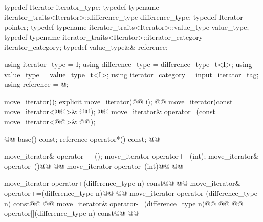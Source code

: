 %
\begin{codeblock}
namespace std { @@
  template <@@>
  class move_iterator {
  public:
\end{codeblock}\begin{removedblock}\begin{codeblock}
    typedef Iterator                                              iterator_type;
    typedef typename iterator_traits<Iterator>::difference_type   difference_type;
    typedef Iterator                                              pointer;
    typedef typename iterator_traits<Iterator>::value_type        value_type;
    typedef typename iterator_traits<Iterator>::iterator_category iterator_category;
    typedef value_type&&                                          reference;
\end{codeblock}\end{removedblock}\begin{addedblock}\begin{codeblock}
    using iterator_type     = I;
    using difference_type   = difference_type_t<I>;
    using value_type        = value_type_t<I>;
    using iterator_category = input_iterator_tag;
    using reference         = @\seebelow@;
\end{codeblock}\end{addedblock}\begin{codeblock}

    move_iterator();
    explicit move_iterator(@@ i);
    @@
    move_iterator(const move_iterator<@@>& @@);
    @@
    move_iterator& operator=(const move_iterator<@@>& @@);

    @@ base() const;
    reference operator*() const;
    @@

    move_iterator& operator++();
    move_iterator operator++(int);
    move_iterator& operator--()@\removed{;}@
      @@
    move_iterator operator--(int)@\removed{;}@
      @@

    move_iterator operator+(difference_type n) const@\removed{;}@
      @@
    move_iterator& operator+=(difference_type n)@\removed{;}@
      @@
    move_iterator operator-(difference_type n) const@\removed{;}@
      @@
    move_iterator& operator-=(difference_type n)@\removed{;}@
      @@
    @@ operator[](difference_type n) const@\removed{;}@
      @@


\end{codeblock}
